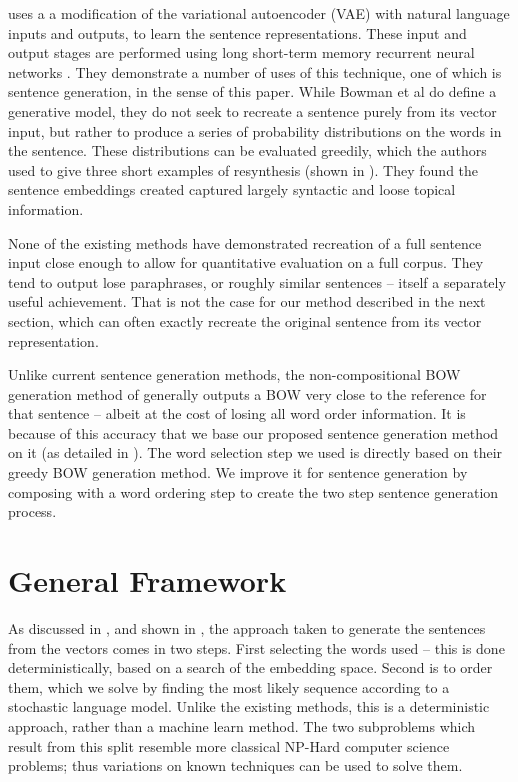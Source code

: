 \documentclass[compsoc]{IEEEtran}
\theoremstyle{plain}
\theoremstyle{definition}
\begin{document}
\textcite{Bowman2015SmoothGeneration} uses a a modification of the variational autoencoder (VAE) \parencite{kingma2013auto} with natural language inputs and outputs, to learn the sentence representations. These input and output stages are performed using long short-term memory recurrent neural networks \parencite{hochreiter1997long}. They demonstrate a number of uses of this technique, one of which is sentence generation, in the sense of this paper.
While Bowman et al do define a generative model, they do not seek to recreate a sentence purely from its vector input, but rather to produce a series of probability distributions on the words in the sentence. These distributions can be evaluated greedily, which the authors used to give three short examples of resynthesis (shown in ). They found the sentence embeddings created captured largely syntactic and loose topical information. 

None of the existing methods have demonstrated recreation of a full sentence input close enough to allow for quantitative evaluation on a full corpus. They tend to output lose paraphrases, or roughly similar sentences -- itself a separately useful achievement.  That is not the case for our method described in the next section, which can often exactly recreate the original sentence from its vector representation.

Unlike current sentence generation methods, the non-compositional BOW generation method of \textcite{White2015BOWgen} generally outputs a BOW very close to the reference for that sentence -- albeit at the cost of losing all word order information. It is because of this accuracy that we base our proposed sentence generation method on it (as detailed in ). The word selection step we used is directly based on their greedy BOW generation method. We improve it for sentence generation by composing with a word ordering step to create the two step sentence generation process.



\section{General Framework}\label{framework}
As discussed in , and shown in , the approach taken to generate the sentences from the vectors comes in two steps. First selecting the words used -- this is done deterministically, based on a search of the embedding space. Second is to order them, which we solve by finding the most likely sequence according to a stochastic language model. Unlike the existing methods, this is a deterministic approach, rather than a machine learn method. The two subproblems which result from this split resemble more classical NP-Hard computer science problems; thus variations on known techniques can be used to solve them.
\end{document}
